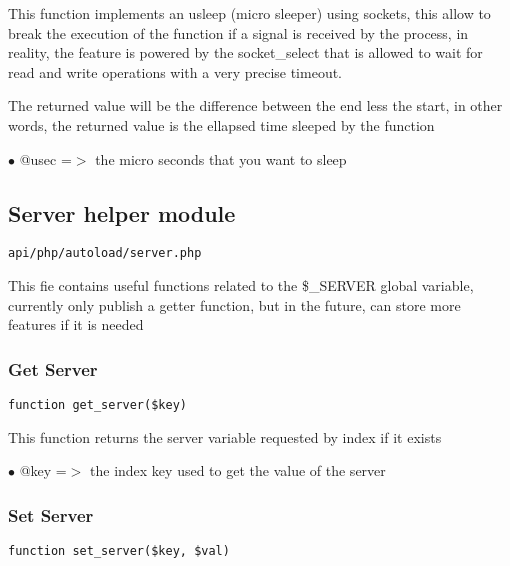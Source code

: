 \documentclass[a4paper]{article}
\begin{document}
This function implements an usleep (micro sleeper) using sockets, this
allow to break the execution of the function if a signal is received by
the process, in reality, the feature is powered by the socket\_select that
is allowed to wait for read and write operations with a very precise
timeout.

The returned value will be the difference between the end less the start,
in other words, the returned value is the ellapsed time sleeped by the
function

\begin{compactitem}
\item[\color{myblue}$\bullet$] @usec =$>$ the micro seconds that you want to sleep
\end{compactitem}

\hypertarget{toc210}{}
\subsection{Server helper module}

\begin{lstlisting}
api/php/autoload/server.php
\end{lstlisting}

This fie contains useful functions related to the \$\_SERVER global variable, currently only publish
a getter function, but in the future, can store more features if it is needed

\hypertarget{toc211}{}
\subsubsection{Get Server}

\begin{lstlisting}
function get_server($key)
\end{lstlisting}

This function returns the server variable requested by index if it exists

\begin{compactitem}
\item[\color{myblue}$\bullet$] @key =$>$ the index key used to get the value of the server
\end{compactitem}

\hypertarget{toc212}{}
\subsubsection{Set Server}

\begin{lstlisting}
function set_server($key, $val)
\end{lstlisting}
\end{document}
